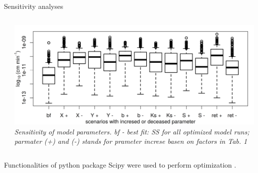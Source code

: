 \begin{block}{Sensitivity analyses}
\begin{columns}
\begin{column}{0.25\textwidth}
\begin{table}[]
        \end{table}
    \end{column}
    \begin{column}{0.5\textwidth}
        \includegraphics[width = \textwidth]{obr/sens.png}
        {\it Sensitivity of model parameters. bf - best fit: SS for all optimized model runs; parmater (+) and (-) stands for prameter increse basen on factors in Tab. 1}
    \end{column}
\end{columns}
Functionalities of python package Scipy were used to perform optimization \citep{scipy}.
\end{block}

% 
